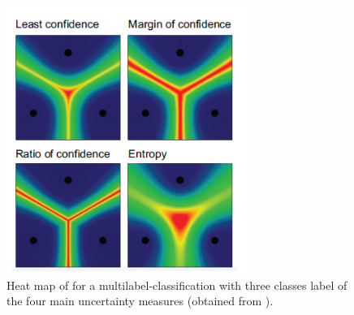 \begin{figure}[t]
  \centering
    \includegraphics[width=0.70\textwidth]{figures/uncertainty_sampling_heatmap.PNG}
  \caption{Heat map of for a multilabel-classification with three classes label of the four main uncertainty measures (obtained from \cite{human-in-the-loop}).}
  \label{fig:uncertainty_sampling_heatmap}
\end{figure}